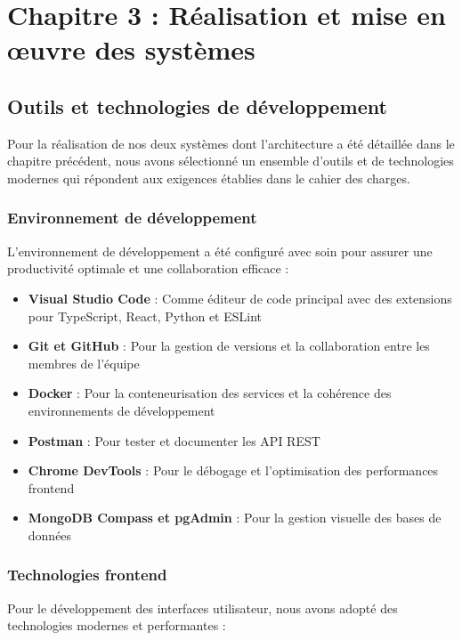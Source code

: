 \chapter*{Chapitre 3 : Réalisation et mise en œuvre des systèmes}
\thispagestyle{fancy}
\setcounter{section}{0}
\newpage

\section{Outils et technologies de développement}
Pour la réalisation de nos deux systèmes dont l'architecture a été détaillée dans le chapitre précédent, nous avons sélectionné un ensemble d'outils et de technologies modernes qui répondent aux exigences établies dans le cahier des charges.

\subsection{Environnement de développement}
L'environnement de développement a été configuré avec soin pour assurer une productivité optimale et une collaboration efficace :

\begin{itemize}
  \item \textbf{Visual Studio Code} : Comme éditeur de code principal avec des extensions pour TypeScript, React, Python et ESLint
  
  \item \textbf{Git et GitHub} : Pour la gestion de versions et la collaboration entre les membres de l'équipe
  
  \item \textbf{Docker} : Pour la conteneurisation des services et la cohérence des environnements de développement
  
  \item \textbf{Postman} : Pour tester et documenter les API REST
  
  \item \textbf{Chrome DevTools} : Pour le débogage et l'optimisation des performances frontend
  
  \item \textbf{MongoDB Compass et pgAdmin} : Pour la gestion visuelle des bases de données
\end{itemize}

\subsection{Technologies frontend}
Pour le développement des interfaces utilisateur, nous avons adopté des technologies modernes et performantes :

